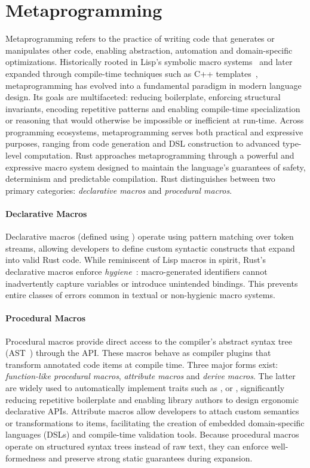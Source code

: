 \section{Metaprogramming}\label{sec:metaprogramming}
Metaprogramming refers to the practice of writing code that generates or manipulates other code, enabling abstraction, automation and domain-specific optimizations.
Historically rooted in Lisp's symbolic macro systems~\cite{McCarthy60} and later expanded through compile-time techniques such as C++ templates~\cite{Vandevoorde02}, metaprogramming has evolved into a fundamental paradigm in modern language design.
Its goals are multifaceted: reducing boilerplate, enforcing structural invariants, encoding repetitive patterns and enabling compile-time specialization or reasoning that would otherwise be impossible or inefficient at run-time.
Across programming ecosystems, metaprogramming serves both practical and expressive purposes, ranging from code generation and DSL construction to advanced type-level computation.
Rust approaches metaprogramming through a powerful and expressive macro system designed to maintain the language's guarantees of safety, determinism and predictable compilation.
Rust distinguishes between two primary categories: \textit{declarative macros} and \textit{procedural macros}.

\paragraph{Declarative Macros}
Declarative macros (defined using ) operate using pattern matching over token streams, allowing developers to define custom syntactic constructs that expand into valid Rust code.
While reminiscent of Lisp macros in spirit, Rust's declarative macros enforce \textit{hygiene}~\cite{HygienicMacros92,Kohlbecker1986HygienicME,Clinger2020HygienicMT}: macro-generated identifiers cannot inadvertently capture variables or introduce unintended bindings.
This prevents entire classes of errors common in textual or non-hygienic macro systems.

\paragraph{Procedural Macros}
Procedural macros provide direct access to the compiler's abstract syntax tree (AST~\cite{Aho06,Baxter98}) through the  API.
These macros behave as compiler plugins that transform annotated code items at compile time.
Three major forms exist: \textit{function-like procedural macros}, \textit{attribute macros} and \textit{derive macros}.
The latter are widely used to automatically implement traits such as ,  or , significantly reducing repetitive boilerplate and enabling library authors to design ergonomic declarative APIs.
Attribute macros allow developers to attach custom semantics or transformations to items, facilitating the creation of embedded domain-specific languages (DSLs) and compile-time validation tools.
Because procedural macros operate on structured syntax trees instead of raw text, they can enforce well-formedness and preserve strong static guarantees during expansion.

